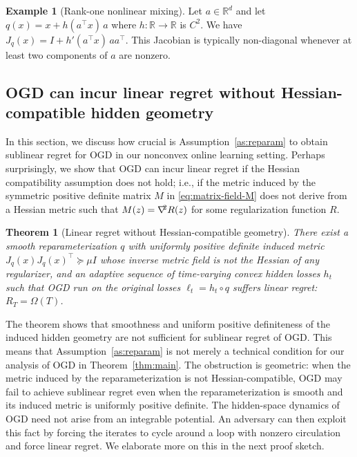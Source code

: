 \documentclass[a4paper,11pt,fullpage]{article}
\theoremstyle{plain}
\newtheorem{theorem}{Theorem}
\theoremstyle{definition}
\newtheorem{example}{Example}
\theoremstyle{plain}
\let\nablaold\nabla
\renewcommand{\nabla}{\nablaold\mkern-2.5mu}
\begin{document}
\begin{example}[Rank-one nonlinear mixing]
Let \(a\in\mathbb R^d\) and let $q(x)=x+h(a^\top x)\,a$ 
where \(h:\mathbb R\to\mathbb R\) is \(C^2\). We have $J_q(x)=I+h'(a^\top x)\,aa^\top.$
This Jacobian is typically non-diagonal whenever at least two components of $a$ are nonzero.
\end{example}

\subsection{OGD can incur linear regret without Hessian-compatible hidden geometry}
\label{subsec:lin-OGD-regret-without-Hessian-comp}

 In this section, we discuss how crucial is Assumption~\ref{as:reparam} to obtain sublinear regret for OGD 
in our nonconvex online learning setting. Perhaps surprisingly, we show that OGD can incur linear regret 
if the Hessian compatibility assumption does not hold; i.e., if the metric induced by the symmetric positive definite matrix $M$ 
in \eqref{eq:matrix-field-M} does not derive from a Hessian metric such that $M(z) = \nabla^2 R(z)$ for some regularization function $R$. 

\begin{tcolorbox}[colframe=white!, top=2pt,left=2pt,right=2pt,bottom=2pt] 
\begin{theorem}[Linear regret without Hessian-compatible geometry]
\label{thm:linear-reg-lower-bound}
There exist a smooth reparameterization $q$ with uniformly positive definite induced metric $J_q(x)J_q(x)^\top \succeq \mu I$ whose 
inverse metric field is not the Hessian of any regularizer, and an adaptive sequence of time-varying convex hidden losses $h_t$ 
such that OGD run on the original losses $\ell_t = h_t \circ q$ suffers linear regret: $R_T = \Omega(T)$. 
\end{theorem}
\end{tcolorbox}

The theorem shows that smoothness and uniform positive definiteness of the induced hidden geometry are not sufficient for sublinear regret of OGD. This means that Assumption~\ref{as:reparam} is not merely a technical condition for our analysis of OGD in Theorem~\ref{thm:main}. 
The obstruction is geometric: when the metric induced by the reparameterization is not Hessian-compatible, OGD may fail to achieve sublinear regret even when the reparameterization is smooth and its induced metric is uniformly positive definite.
The hidden-space dynamics of OGD need not arise from an integrable potential. 
An adversary can then exploit this fact by forcing the iterates to cycle around a loop with nonzero circulation and force linear regret. We elaborate more on this in the next proof sketch.\\ 
\end{document}

